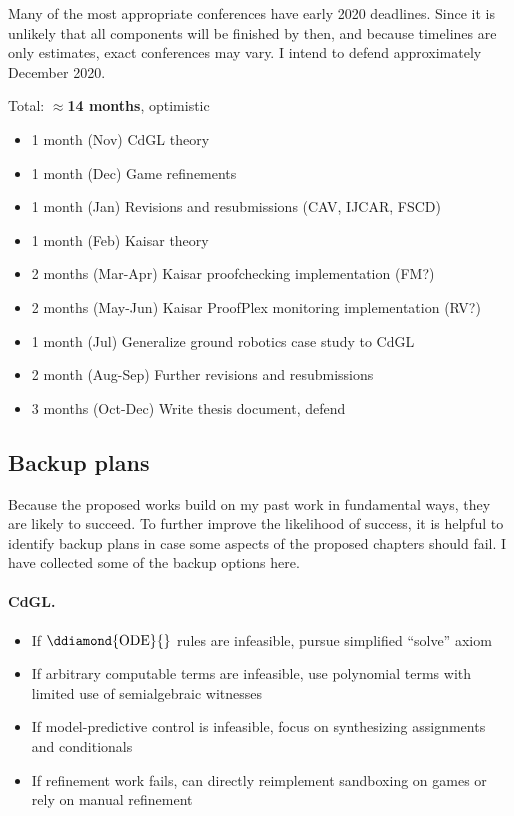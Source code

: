 \documentclass[12pt]{cmuthesis}
\theoremstyle{definition}
\theoremstyle{remark}
\newcommand{\CdGL}{\textsf{CdGL}\xspace}
\newcommand{\ProofPlex}{ProofPlex\xspace}
\begin{document}
Many of the most appropriate conferences have early 2020 deadlines.
Since it is unlikely that all components will be finished by then, and because timelines are only estimates, exact conferences may vary.
I intend to defend approximately December 2020.

Total: $\approx$\textbf{14 months}, optimistic
\begin{itemize}
\item 1 month (Nov) \CdGL theory
\item 1 month (Dec) Game refinements
\item 1 month (Jan) Revisions and resubmissions (CAV, IJCAR, FSCD)
\item 1 month (Feb) Kaisar theory
\item 2 months (Mar-Apr) Kaisar proofchecking implementation (FM?)
\item 2 months (May-Jun) Kaisar \ProofPlex monitoring implementation (RV?)
\item 1 month (Jul) Generalize ground robotics case study to \CdGL
\item 2 month (Aug-Sep) Further revisions and resubmissions
\item 3 months (Oct-Dec) Write thesis document, defend
\end{itemize}

\subsection{Backup plans}
Because the proposed works build on my past work in fundamental ways, they are likely to succeed.
To further improve the likelihood of success, it is helpful to identify backup plans in case some aspects of the proposed chapters should fail.
I have collected some of the backup options here.

\paragraph*{CdGL.}
\begin{itemize}
\item If $\ddiamond{\text{ODE}}{}$ rules are infeasible, pursue simplified ``solve'' axiom
\item If arbitrary computable terms are infeasible, use polynomial terms with limited use of semialgebraic witnesses
\item If model-predictive control is infeasible, focus on synthesizing assignments and conditionals
\item If refinement work fails, can directly reimplement sandboxing on games or rely on manual refinement
\end{itemize}
\end{document}
